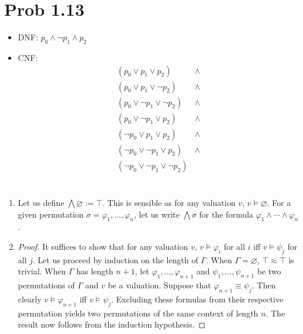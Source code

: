 \documentclass[a4paper]{article}
\begin{document}
\section{Prob 1.13}
\begin{itemize}
\item[] DNF: $p_{0} \wedge \lnot p_{1} \wedge p_{2}$
\item[] CNF:
  \begin{align*}
    (p_{0} \vee p_{1} \vee p_{2}) &\wedge\\
    (p_{0} \vee p_{1} \vee \lnot p_{2}) &\wedge\\
    (p_{0} \vee \lnot p_{1} \vee \lnot p_{2}) &\wedge\\
    (p_{0} \vee \lnot p_{1} \vee p_{2}) &\wedge\\
    (\lnot p_{0} \vee p_{1} \vee p_{2}) &\wedge\\
    (\lnot p_{0} \vee \lnot p_{1} \vee p_{2}) &\wedge\\
    (\lnot p_{0} \vee \lnot p_{1} \vee \lnot p_{2})
  \end{align*}
\end{itemize}

\section{}
\begin{enumerate}
\item Let us define $\bigwedge\varnothing := \top$.
  This is sensible as for any valuation $v$, $v \models \varnothing$.
  For a given permutation $\sigma = \varphi_{1},\ldots,\varphi_{n}$, let us write $\bigwedge\sigma$ for the formula $\varphi_{1} \wedge \cdots \wedge \varphi_{n}$.
\item
  \begin{proof}
    It suffices to show that for any valuation $v$, $v \models \varphi_{i}$ for all $i$ iff $v \models \psi_{j}$ for all $j$.
    Let us proceed by induction on the length of $\Gamma$.
    When $\Gamma = \varnothing$, $\top \approx \top$ is trivial.
    When $\Gamma$ has length $n+1$, let $\varphi_{1},\ldots,\varphi_{n+1}$ and $\psi_{1},\ldots,\psi_{n+1}$ be two permutations of $\Gamma$ and $v$ be a valuation.
    Suppose that $\varphi_{n+1} \equiv \psi_{j}$.
    Then clearly $v \models \varphi_{n+1}$ iff $v \models \psi_{j}$.
    Excluding these formulas from their respective permutation yields two permutations of the same context of length $n$.
    The result now follows from the induction hypothesis.
  \end{proof}
\end{enumerate}
\end{document}
